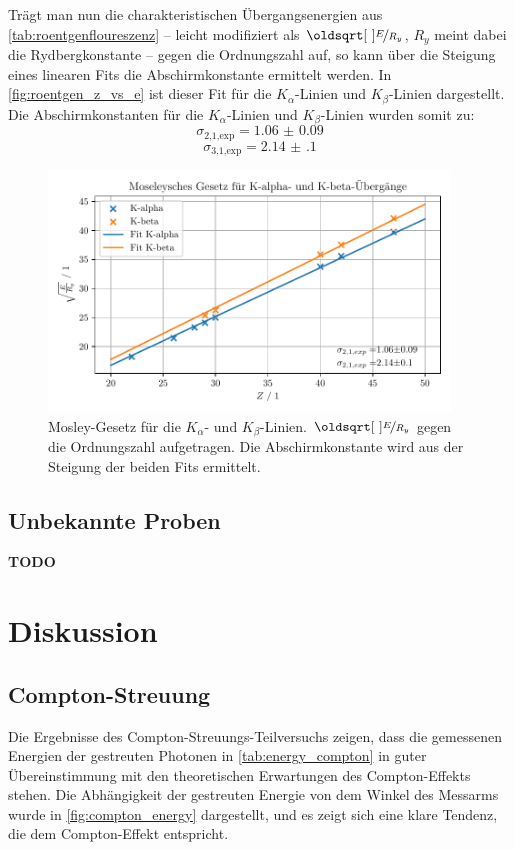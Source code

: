 \documentclass[ngerman]{scrartcl}
\begin{document}
Trägt man nun die charakteristischen Übergangsenergien aus \autoref{tab:roentgenfloureszenz} -- leicht modifiziert  als $\sqrt{\nicefrac{E}{R_y}}$, $R_y$ meint dabei die Rydbergkonstante -- gegen die Ordnungszahl auf, so kann über die Steigung eines linearen Fits die Abschirmkonstante ermittelt werden. In \autoref{fig:roentgen_z_vs_e} ist dieser Fit für die $K_{\alpha}$-Linien und $K_{\beta}$-Linien dargestellt. Die Abschirmkonstanten für die $K_{\alpha}$-Linien und $K_{\beta}$-Linien wurden somit zu:
\[\sigma_{\text{2,1,exp}} = \num{1.06(9)} \]
\[\sigma_{\text{3,1,exp}} = \num{2.14(10)}\]
\begin{figure}[H]
    \centering
    \begin{samepage}
        \includegraphics[width=0.95\textwidth]{../plots/roentgen_data_Z_vs_E.pdf}
        \caption[Mosley-Gesetz für die $K_{\alpha}$- und $K_{\beta}$-Linien.]{Mosley-Gesetz für die $K_{\alpha}$- und $K_{\beta}$-Linien. $\sqrt{\nicefrac{E}{R_y}}$ gegen die Ordnungszahl aufgetragen. Die Abschirmkonstante wird aus der Steigung der beiden Fits ermittelt.}
        \label{fig:roentgen_z_vs_e}
    \end{samepage}
\end{figure}
\subsection{Unbekannte Proben}
\label{sec:roentgen_unbekannt}
\textbf{TODO}
\section{Diskussion}
\label{sec:diskussion}
\subsection{Compton-Streuung}
\label{sec:diskussion_compton}
Die Ergebnisse des Compton-Streuungs-Teilversuchs zeigen, dass die gemessenen Energien der gestreuten Photonen in \autoref{tab:energy_compton} in guter Übereinstimmung mit den theoretischen Erwartungen des Compton-Effekts stehen. Die Abhängigkeit der gestreuten Energie von dem Winkel des Messarms wurde in \autoref{fig:compton_energy} dargestellt, und es zeigt sich eine klare Tendenz, die dem Compton-Effekt entspricht.
\end{document}

